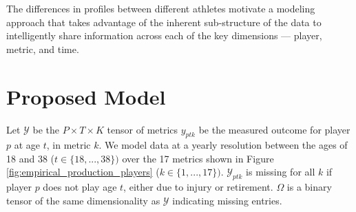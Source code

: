 \documentclass[aoas]{imsart}
\begin{document}
The differences in profiles between different athletes motivate a modeling approach that takes advantage of the inherent sub-structure of the data to intelligently share information across each of the key dimensions --- player, metric, and time. 












\section{Proposed Model}

\label{sec:proposed_model}

Let $\mathcal{Y}$ be the $P \times T \times K$ tensor of metrics $y_{ptk}$ be the measured outcome for player $p$ at age $t$, in metric $k$.  We model data at a yearly resolution between the ages of 18 and 38 ($t \in \{18, ..., 38\})$ over the 17 metrics shown in Figure \ref{fig:empirical_production_players} ($k \in \{1, ..., 17\})$. 
$\mathcal{Y}_{ptk}$ is missing for all $k$ if player $p$ does not play age $t$, either due to injury or retirement.  $\Omega$ is a binary tensor of the same dimensionality as $\mathcal{Y}$ indicating missing entries.


\end{document}
